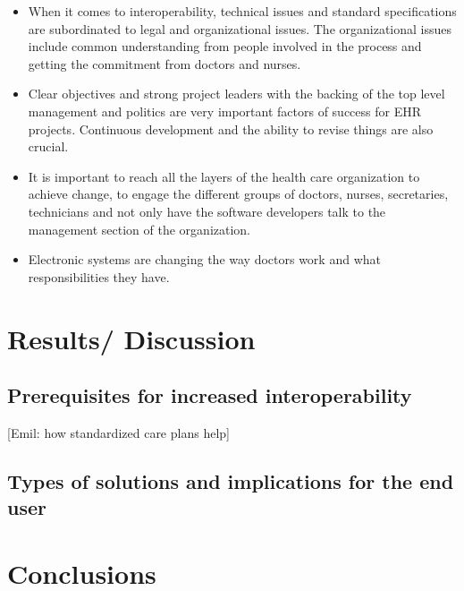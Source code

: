 \documentclass[14pt]{article}
\begin{document}
\begin{itemize}
\item When it comes to \gls{interoperability}, technical issues and standard specifications are subordinated to legal and organizational issues. The organizational issues include common understanding from people involved in the process and getting the commitment from doctors and nurses. 
\item Clear objectives and strong project leaders with the backing of the top level management and politics are very important factors of success for \gls{EHR} projects. Continuous development and the ability to revise things are also crucial.
\item It is important to reach all the layers of the health care organization to achieve change, to engage the different groups of doctors, nurses, secretaries, technicians and not only have the software developers talk to the management section of the organization.
\item Electronic systems are changing the way doctors work and what responsibilities they have.
\end{itemize}

\newpage

\section{Results/ Discussion}

\subsection{Prerequisites for increased interoperability}

[Emil: how standardized care plans help]

\subsection{Types of solutions and implications for the end user}

\newpage

\section{Conclusions}


\newpage

\begin{appendix}


\end{appendix}

\newpage

 
 
\end{document}
